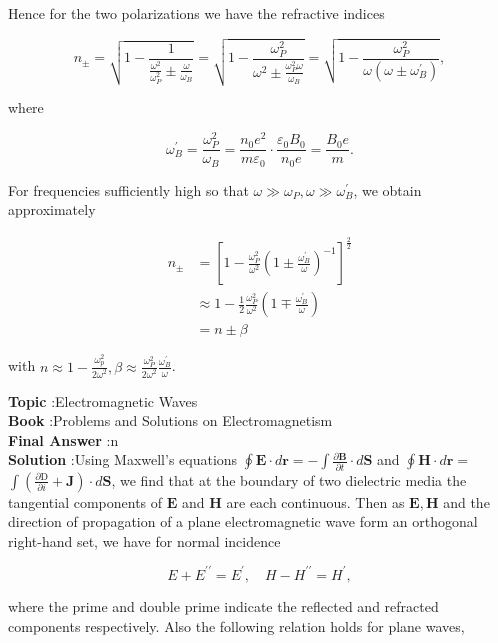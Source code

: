 \documentclass[10pt]{article}
\begin{document}
Hence for the two polarizations we have the refractive indices

$$
n_{\pm}=\sqrt{1-\frac{1}{\frac{\omega^{2}}{\omega_{P}^{2}} \pm \frac{\omega}{\omega_{B}}}}=\sqrt{1-\frac{\omega_{P}^{2}}{\omega^{2} \pm \frac{\omega_{P}^{2} \omega}{\omega_{B}}}}=\sqrt{1-\frac{\omega_{P}^{2}}{\omega\left(\omega \pm \omega_{B}^{\prime}\right)}},
$$

where

$$
\omega_{B}^{\prime}=\frac{\omega_{P}^{2}}{\omega_{B}}=\frac{n_{0} e^{2}}{m \varepsilon_{0}} \cdot \frac{\varepsilon_{0} B_{0}}{n_{0} e}=\frac{B_{0} e}{m} .
$$

For frequencies sufficiently high so that $\omega \gg \omega_{P}, \omega \gg \omega_{B}^{\prime}$, we obtain approximately

$$
\begin{aligned}
n_{\pm} &=\left[1-\frac{\omega_{P}^{2}}{\omega^{2}}\left(1 \pm \frac{\omega_{B}^{\prime}}{\omega}\right)^{-1}\right]^{\frac{2}{2}} \\
& \approx 1-\frac{1}{2} \frac{\omega_{P}^{2}}{\omega^{2}}\left(1 \mp \frac{\omega_{B}^{\prime}}{\omega}\right) \\
&=n \pm \beta
\end{aligned}
$$

with $n \approx 1-\frac{\omega_{p}^{2}}{2 \omega^{2}}, \beta \approx \frac{\omega_{P}^{2}}{2 \omega^{2}} \frac{\omega_{B}^{\prime}}{\omega}$.


\textbf{Topic} :Electromagnetic Waves\\
\textbf{Book} :Problems and Solutions on Electromagnetism\\
\textbf{Final Answer} :n \pm \beta\\


\textbf{Solution} :Using Maxwell's equations $\oint \mathbf{E} \cdot d \mathbf{r}=-\int \frac{\partial \mathbf{B}}{\partial t} \cdot d \mathbf{S}$ and $\oint \mathbf{H} \cdot d \mathbf{r}=$ $\int\left(\frac{\partial \mathrm{D}}{\partial i}+\mathbf{J}\right) \cdot d \mathbf{S}$, we find that at the boundary of two dielectric media the tangential components of $\mathbf{E}$ and $\mathbf{H}$ are each continuous. Then as $\mathbf{E}, \mathbf{H}$ and the direction of propagation of a plane electromagnetic wave form an orthogonal right-hand set, we have for normal incidence

$$
E+E^{\prime \prime}=E^{\prime}, \quad H-H^{\prime \prime}=H^{\prime},
$$

where the prime and double prime indicate the reflected and refracted components respectively. Also the following relation holds for plane waves,
\end{document}
